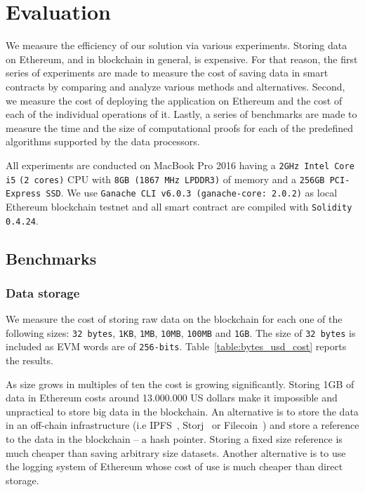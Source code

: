 \chapter{Evaluation}
\label{evaluation}

We measure the efficiency of our solution via various experiments. Storing data on Ethereum, and in blockchain in general, is expensive. For that reason, the first series of experiments are made to measure the cost of saving data in smart contracts by comparing and analyze various methods and alternatives. Second, we measure the cost of deploying the application on Ethereum and the cost of each of the individual operations of it. Lastly, a series of benchmarks are made to measure the time and the size of computational proofs for each of the predefined algorithms supported by the data processors.

All experiments are conducted on MacBook Pro 2016 having a \verb|2GHz Intel Core i5| \verb|(2 cores)| CPU with \verb|8GB (1867 MHz LPDDR3)| of memory and a \verb|256GB PCI-Express SSD|. We use \verb|Ganache CLI v6.0.3 (ganache-core: 2.0.2)| as local Ethereum blockchain testnet and all smart contract are compiled with \verb|Solidity 0.4.24|.

\section{Benchmarks}
\label{evaluation:benchmarks}

\subsection{Data storage}
\label{evaluation:data_storage}

We measure the cost of storing raw data on the blockchain for each one of the following sizes: \verb|32 bytes|, \verb|1KB|, \verb|1MB|, \verb|10MB|, \verb|100MB| and \verb|1GB|. The size of \verb|32 bytes| is included as EVM words are of \verb|256-bits|. Table~\ref{table:bytes_usd_cost} reports the results.

As size grows in multiples of ten the cost is growing significantly. Storing 1GB of data in Ethereum costs around 13.000.000 US dollars make it impossible and unpractical to store big data in the blockchain. An alternative is to store the data in an off-chain infrastructure (i.e IPFS~\cite{ipfs}, Storj~\cite{storj} or Filecoin~\cite{filecoin}) and store a reference to the data in the blockchain -- a hash pointer. Storing a fixed size reference is much cheaper than saving arbitrary size datasets. Another alternative is to use the logging system of Ethereum whose cost of use is much cheaper than direct storage.

